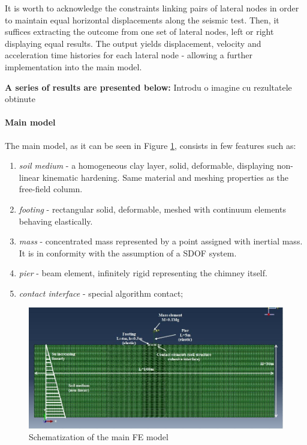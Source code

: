 \documentclass[10pt,a4paper]{report}
\begin{document}
	It is worth to acknowledge the constraints linking pairs of lateral nodes in order to maintain equal horizontal displacements along the seismic test. Then, it suffices extracting the outcome from one set of lateral nodes, left or right displaying equal results. The output yields displacement, velocity and acceleration time histories for each lateral node - allowing a further implementation into the main model.
	
	\textbf{A series of results are presented below:}
	 Introdu o imagine cu rezultatele obtinute
	\paragraph{Main model}
	The main model, as it can be seen in Figure \ref{mainM}, consists in few features such as:
	\begin{enumerate}
		\item \textit{soil medium} - a homogeneous clay layer, solid, deformable, displaying non-linear kinematic hardening. Same material and meshing properties as the free-field column.
		\item \textit{footing} -  rectangular solid, deformable, meshed with continuum elements behaving elastically.
		\item \textit{mass} - concentrated mass represented by a point assigned with inertial mass. It is in conformity with the assumption of a SDOF system.
		\item \textit{pier} - beam element, infinitely rigid representing the chimney itself.
		\item \textit{contact interface} - special algorithm contact;
	\end{enumerate}
	
		\begin{figure}[!h]
			\centering
			\includegraphics[width=0.9\linewidth]{"mainmodel"}
			\caption{Schematization of the main FE model}
			\label{mainM}
		\end{figure}
		
\end{document}
